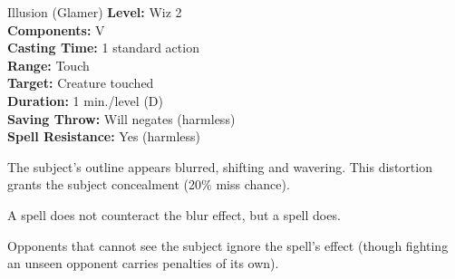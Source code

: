 {Illusion (Glamer)}
{
	\textbf{Level:}
	Wiz 2\\
	\textbf{Components:}
	V\\
	\textbf{Casting Time:}
	1 standard action\\
	\textbf{Range:}
	Touch\\
	\textbf{Target:}
	Creature touched\\
	\textbf{Duration:}
	1 min./level (D)\\
	\textbf{Saving Throw:}
	Will negates (harmless)\\
	\textbf{Spell Resistance:}
	Yes (harmless)\\
}
{
	The subject's outline appears blurred, shifting and wavering. This distortion grants the subject concealment (20\% miss chance).

	A  spell does not counteract the blur effect, but a  spell does.

	Opponents that cannot see the subject ignore the spell's effect (though fighting an unseen opponent carries penalties of its own).

}
